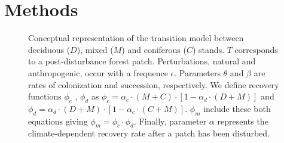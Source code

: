 \section{Methods}   

\begin{figure}
	
	\caption{Conceptual representation of the transition model between deciduous ($D$),
	mixed ($M$) and coniferous ($C$) stands. $T$ corresponds to a post-disturbance forest patch. Perturbations, natural and anthropogenic, occur with a frequence $\epsilon$. Parameters $\theta$ and $\beta$ are rates of colonization and succession,
	respectively. We define recovery functions $\phi_c$ , $\phi_d$ as $\phi_c
	= \alpha_c \cdot (M+C) \cdot [1- \alpha_d \cdot (D+M)]$ and $\phi_d =
	\alpha_d \cdot (D+M) \cdot [1- \alpha_c \cdot (C+M)]$. $\phi_m$ include these both equations giving $\phi_m = \phi_c \cdot \phi_d$. Finally, parameter $\alpha$ represents the climate-dependent recovery rate after a patch has been disturbed.}
	\label{Model}
	\vspace{-1em}
\end{figure}


